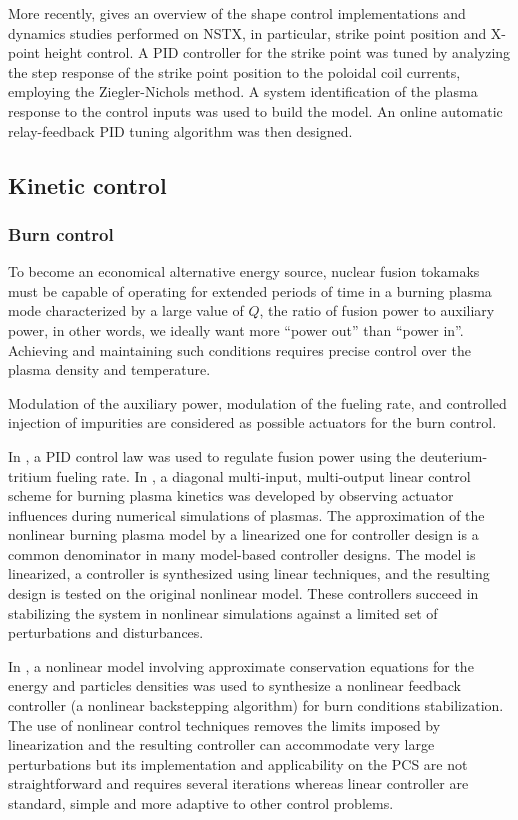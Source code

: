 \documentclass[12pt,lot, lof]{puthesis}
\begin{document}
More recently, \cite{Kolemen11} gives an overview of the shape control implementations and dynamics studies  performed on NSTX, in particular, strike point position and X-point height control.
A PID controller for the strike point was tuned by analyzing the step response of the strike point position to the poloidal coil currents, employing the Ziegler-Nichols method. A system identification of the plasma response to the control inputs was used to build the model. An online automatic relay-feedback PID tuning algorithm was then designed.


\subsection{Kinetic control}


\subsubsection{{Burn control}} 
To become an economical alternative energy source, nuclear fusion tokamaks must be capable of operating for extended periods of time in a burning plasma mode characterized by a large value of $Q$, the ratio of fusion power to auxiliary power, in other words, we ideally want more ``power out'' than ``power in''. Achieving and maintaining such conditions requires precise control over the plasma density and temperature.

Modulation of the auxiliary power, modulation of the fueling rate, and controlled injection of impurities are considered as possible actuators for the burn control.

In \cite{Mitarai10}, a PID control law was used to regulate fusion power using the deuterium-tritium fueling rate.
In \cite{Leonov05}, a diagonal multi-input, multi-output linear control scheme for burning plasma kinetics was developed by observing actuator influences during numerical simulations of plasmas.
The approximation of the nonlinear burning plasma model by a linearized one for controller design is a common denominator in many model-based controller designs. The model is linearized, a controller is synthesized using linear techniques, and the resulting design is tested on the original nonlinear model. 
These controllers succeed in stabilizing the system in nonlinear simulations against a limited set of perturbations and disturbances.

In \cite{Schuster03}, a nonlinear model involving approximate conservation equations for the energy and particles densities was used to synthesize a nonlinear feedback controller (a nonlinear backstepping algorithm) for burn conditions stabilization. The use of nonlinear control techniques removes the limits imposed by linearization and the resulting controller can accommodate very large perturbations but its implementation and applicability on the PCS are not straightforward and requires several iterations whereas linear controller are standard, simple and more adaptive to other control problems.
\end{document}

